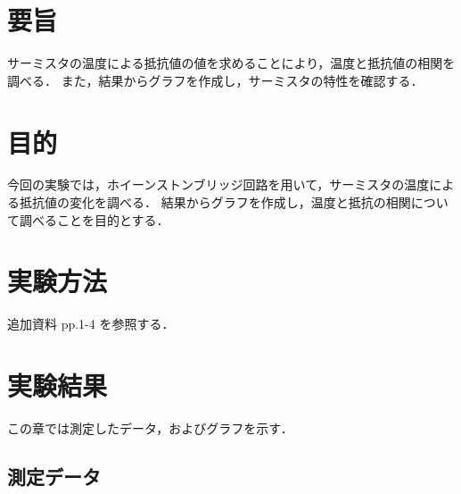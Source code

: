 \documentclass[a4paper,11pt,dvipdfmx]{jsarticle}
\begin{document}
\section{要旨}
サーミスタの温度による抵抗値の値を求めることにより，温度と抵抗値の相関を調べる．
また，結果からグラフを作成し，サーミスタの特性を確認する．

\section{目的}
今回の実験では，ホイーンストンブリッジ回路を用いて，サーミスタの温度による抵抗値の変化を調べる．
結果からグラフを作成し，温度と抵抗の相関について調べることを目的とする．
\section{実験方法}
追加資料 pp.1-4 を参照する．

\section{実験結果}
この章では測定したデータ，およびグラフを示す．
\subsection{測定データ}
\end{document}
